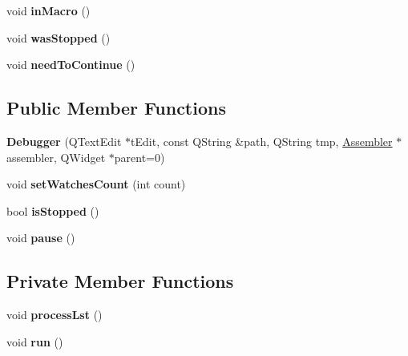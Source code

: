 \begin{DoxyCompactItemize}
\item 
\hypertarget{class_debugger_a7652cfcdc33f9c8d5ea82bcf1d2f497d}{}void {\bfseries in\+Macro} ()\label{class_debugger_a7652cfcdc33f9c8d5ea82bcf1d2f497d}

\item 
\hypertarget{class_debugger_ac31d9a6bd5f7096346fc1e0d693556dd}{}void {\bfseries was\+Stopped} ()\label{class_debugger_ac31d9a6bd5f7096346fc1e0d693556dd}

\item 
\hypertarget{class_debugger_a2d80e136e4642751be887681efcc0ad5}{}void {\bfseries need\+To\+Continue} ()\label{class_debugger_a2d80e136e4642751be887681efcc0ad5}

\end{DoxyCompactItemize}
\subsection*{Public Member Functions}
\begin{DoxyCompactItemize}
\item 
\hypertarget{class_debugger_afbf5c91cfe0f4bf6953bd241af0b6b0a}{}{\bfseries Debugger} (Q\+Text\+Edit $\ast$t\+Edit, const Q\+String \&path, Q\+String tmp, \hyperlink{class_assembler}{Assembler} $\ast$assembler, Q\+Widget $\ast$parent=0)\label{class_debugger_afbf5c91cfe0f4bf6953bd241af0b6b0a}

\item 
\hypertarget{class_debugger_afcddd18a500da8763d72a0714486956a}{}void {\bfseries set\+Watches\+Count} (int count)\label{class_debugger_afcddd18a500da8763d72a0714486956a}

\item 
\hypertarget{class_debugger_a0d42b6de1ebec7605bcf3b6cab2eb65d}{}bool {\bfseries is\+Stopped} ()\label{class_debugger_a0d42b6de1ebec7605bcf3b6cab2eb65d}

\item 
\hypertarget{class_debugger_a6f041e29ae97defbde7ed711fb175e62}{}void {\bfseries pause} ()\label{class_debugger_a6f041e29ae97defbde7ed711fb175e62}

\end{DoxyCompactItemize}
\subsection*{Private Member Functions}
\begin{DoxyCompactItemize}
\item 
\hypertarget{class_debugger_a5e5bd24a61e98d7854ff9f1b5a79cd1e}{}void {\bfseries process\+Lst} ()\label{class_debugger_a5e5bd24a61e98d7854ff9f1b5a79cd1e}

\item 
\hypertarget{class_debugger_a1df28a43e7686d9aa06714fc8b534072}{}void {\bfseries run} ()\label{class_debugger_a1df28a43e7686d9aa06714fc8b534072}

\end{DoxyCompactItemize}

